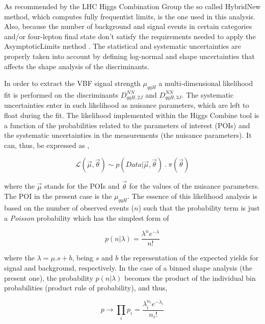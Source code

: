 As recommended by the LHC Higgs Combination Group \cite{bib:HiggsCombineToolWebPage} the so called HybridNew method, which computes fully frequentist limits, is the one used in this analysis. Also, because the number of background and signal events in certain categories and/or four-lepton final state don't satisfy the requirements needed to apply the AsymptoticLimits method \cite{bib:HiggsCombineToolFNALWorkshop2018}. The statistical and systematic uncertainties are properly taken into account by defining log-normal and shape uncertainties that affects the shape analysis of the discriminants.

In order to extract the VBF signal strength $\mu_{qqH}$ a multi-dimensional likelihood fit is performed on the discriminants $D_{qqH,2J}^{NN}$ and $D_{qqH,3J}^{NN}$. The systematic uncertainties enter in such likelihood as nuisance parameters, which are left to float during the fit. The likelihood implemented within the Higgs Combine tool is a function of the probabilities related to the parameters of interest (POIs) and the systematic uncertainties in the measurements (the nuisance parameters). It can, thus, be expressed as \cite{bib:HiggsCombineToolFNALWorkshop2018},

\begin{equation}
\mathcal{L}(\vec{\mu},\vec{\theta}) \sim p(Data | \vec{\mu},\vec{\theta})~.~ \pi(\vec{\theta})
\end{equation}

where the $\vec{\mu}$ stands for the POIs and $\vec{\theta}$ for the values of the nuisance parameters. The POI in the present case is the $\mu_{qqH}$. The essence of this likelihood analysis is based on the number of observed events ($n$) such that the probability term is just a \textit{Poisson} probability which has the simplest form of

\begin{equation}
p(n | \lambda) = \frac{\lambda^{n} e^{-\lambda}}{n!}
\end{equation}

where the $\lambda = \mu.s + b$, being $s$ and $b$ the representation of the expected yields for signal and background, respectively. In the case of a binned shape analysis (the present one), the probability $p(n | \lambda)$ becomes the product of the individual bin probabilities (product rule of probability), and thus,

\begin{equation}
p \rightarrow \prod_{i} p_{i} = \frac{\lambda_{i}^{n_i} e^{-\lambda_{i}}}{n_i!}
\end{equation}

